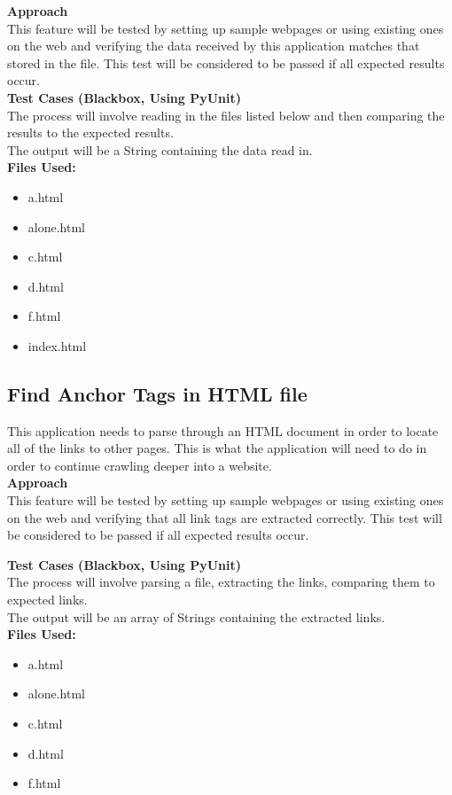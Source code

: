 \documentclass[12pt, titlepage]{article}
\begin{document}
\textbf{Approach}\\

This feature will be tested by setting up sample webpages or using existing ones on the web and verifying the data received by this application matches that stored in the file. This test will be considered to be passed if all expected results occur.\\

\textbf{Test Cases (Blackbox, Using PyUnit)}\\
The process will involve reading in the files listed below and then comparing the results to the expected results.\\
The output will be a String containing the data read in.\\

\textbf{Files Used:}
\begin{itemize}
\item a.html
\item alone.html
\item c.html
\item d.html
\item f.html
\item index.html
\end{itemize}

\subsection{Find Anchor Tags in HTML file}
This application needs to parse through an HTML document in order to locate all of the links to other pages. This is what the application will need to do in order to continue crawling deeper into a website.\\

\textbf{Approach}\\
This feature will be tested by setting up sample webpages or using existing ones on the web and verifying that all link tags are extracted correctly. This test will be considered to be passed if all expected results occur.

\textbf{Test Cases (Blackbox, Using PyUnit)}\\
The process will involve parsing a file, extracting the links, comparing them to expected links.\\
The output will be an array of Strings containing the extracted links.\\

\textbf{Files Used:}
\begin{itemize}
\item a.html
\item alone.html
\item c.html
\item d.html
\item f.html
\end{itemize}
\end{document}

